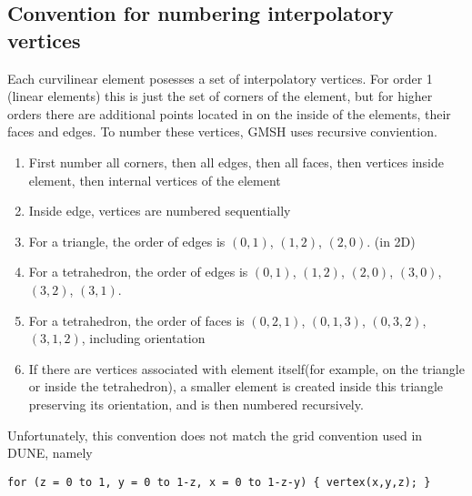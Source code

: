\documentclass[12pt]{article}
\begin{document}
\subsection{Convention for numbering interpolatory vertices}

\noindent
Each curvilinear element posesses a set of interpolatory vertices. For order 1 (linear elements) this is just the set of corners of the element, but for higher orders there are additional points located in on the inside of the elements, their faces and edges. To number these vertices, GMSH uses recursive conviention.

\begin{enumerate}
	\item First number all corners, then all edges, then all faces, then vertices inside element, then internal vertices of the element
	\item Inside edge, vertices are numbered sequentially
	\item For a triangle, the order of edges is $(0,1)$, $(1,2)$, $(2,0)$. (in 2D)
	\item For a tetrahedron, the order of edges is $(0,1)$, $(1,2)$, $(2,0)$, $(3,0)$, $(3,2)$, $(3,1)$.
	\item For a tetrahedron, the order of faces is $(0, 2, 1)$, $(0, 1, 3)$, $(0, 3, 2)$, $(3, 1, 2)$, including orientation
	\item If there are vertices associated with element itself(for example, on the triangle or inside the tetrahedron), a smaller element is created inside this triangle preserving its orientation, and is then numbered recursively.
\end{enumerate}

\noindent
Unfortunately, this convention does not match the grid convention used in DUNE, namely
\begin{mybox}
\begin{lstlisting}
for (z = 0 to 1, y = 0 to 1-z, x = 0 to 1-z-y) { vertex(x,y,z); }
\end{lstlisting}
\end{mybox}
\end{document}
